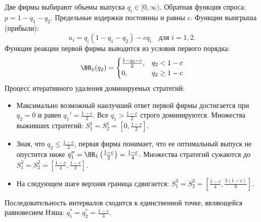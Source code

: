 \begin{example}
Две фирмы выбирают объемы выпуска $q_i \in [0, \infty)$. Обратная функция спроса: $p = 1 - q_1 - q_2$. Предельные издержки постоянны и равны $c$.
Функции выигрыша (прибыли):
\begin{equation}
    u_i = q_i(1 - q_1 - q_2) - c q_i \quad \text{для } i=1, 2.
\end{equation}
Функция реакции первой фирмы выводится из условия первого порядка:
\begin{equation}
    \BR_1(q_2) = 
    \begin{cases}
        \frac{1 - q_2 - c}{2}, & q_2 < 1 - c \\
        0, & q_2 \ge 1 - c
    \end{cases}
\end{equation}
Процесс итеративного удаления доминируемых стратегий:
\begin{itemize}
    \item Максимально возможный наилучший ответ первой фирмы достигается при $q_2 = 0$ и равен $q_1' = \frac{1-c}{2}$. Все $q_1 > \frac{1-c}{2}$ строго доминируются. Множества выживших стратегий: $S_1^1 = S_2^1 = \left[0, \frac{1-c}{2}\right]$.
    \item Зная, что $q_2 \le \frac{1-c}{2}$, первая фирма понимает, что ее оптимальный выпуск не опустится ниже $q_1'' = \BR_1\left(\frac{1-c}{2}\right) = \frac{1-c}{4}$. Множества стратегий сужаются до $S_1^2 = S_2^2 = \left[\frac{1-c}{4}, \frac{1-c}{2}\right]$.
    \item На следующем шаге верхняя граница сдвигается: $S_1^3 = S_2^3 = \left[\frac{1-c}{4}, \frac{3(1-c)}{8}\right]$.
\end{itemize}
Последовательность интервалов сходится к единственной точке, являющейся равновесием Нэша: $q_1^* = q_2^* = \frac{1-c}{3}$.
\end{example}
